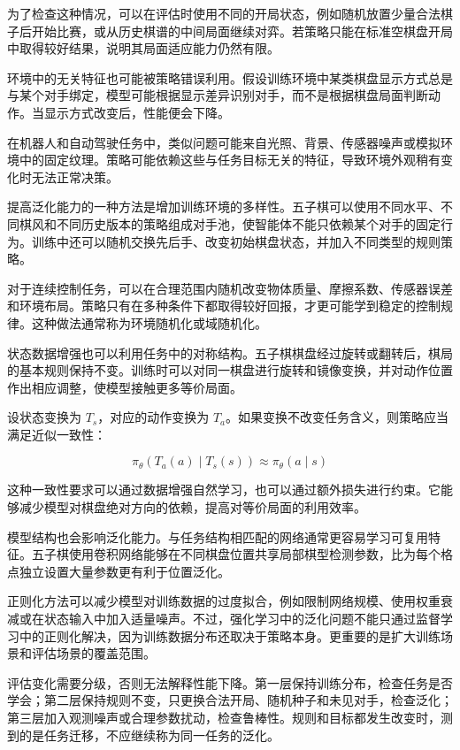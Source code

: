 为了检查这种情况，可以在评估时使用不同的开局状态，例如随机放置少量合法棋子后开始比赛，或从历史棋谱的中间局面继续对弈。若策略只能在标准空棋盘开局中取得较好结果，说明其局面适应能力仍然有限。

环境中的无关特征也可能被策略错误利用。假设训练环境中某类棋盘显示方式总是与某个对手绑定，模型可能根据显示差异识别对手，而不是根据棋盘局面判断动作。当显示方式改变后，性能便会下降。

在机器人和自动驾驶任务中，类似问题可能来自光照、背景、传感器噪声或模拟环境中的固定纹理。策略可能依赖这些与任务目标无关的特征，导致环境外观稍有变化时无法正常决策。

提高泛化能力的一种方法是增加训练环境的多样性。五子棋可以使用不同水平、不同棋风和不同历史版本的策略组成对手池，使智能体不能只依赖某个对手的固定行为。训练中还可以随机交换先后手、改变初始棋盘状态，并加入不同类型的规则策略。

对于连续控制任务，可以在合理范围内随机改变物体质量、摩擦系数、传感器误差和环境布局。策略只有在多种条件下都取得较好回报，才更可能学到稳定的控制规律。这种做法通常称为环境随机化或域随机化。

状态数据增强也可以利用任务中的对称结构。五子棋棋盘经过旋转或翻转后，棋局的基本规则保持不变。训练时可以对同一棋盘进行旋转和镜像变换，并对动作位置作出相应调整，使模型接触更多等价局面。

设状态变换为 $T_s$，对应的动作变换为 $T_a$。如果变换不改变任务含义，则策略应当满足近似一致性：

\begin{equation}
\pi_{\theta}
\left(
T_a(a)\mid T_s(s)
\right)
\approx
\pi_{\theta}(a\mid s)
\end{equation}

这种一致性要求可以通过数据增强自然学习，也可以通过额外损失进行约束。它能够减少模型对棋盘绝对方向的依赖，提高对等价局面的利用效率。

模型结构也会影响泛化能力。与任务结构相匹配的网络通常更容易学习可复用特征。五子棋使用卷积网络能够在不同棋盘位置共享局部棋型检测参数，比为每个格点独立设置大量参数更有利于位置泛化。

正则化方法可以减少模型对训练数据的过度拟合，例如限制网络规模、使用权重衰减或在状态输入中加入适量噪声。不过，强化学习中的泛化问题不能只通过监督学习中的正则化解决，因为训练数据分布还取决于策略本身。更重要的是扩大训练场景和评估场景的覆盖范围。

评估变化需要分级，否则无法解释性能下降。第一层保持训练分布，检查任务是否学会；第二层保持规则不变，只更换合法开局、随机种子和未见对手，检查泛化；第三层加入观测噪声或合理参数扰动，检查鲁棒性。规则和目标都发生改变时，测到的是任务迁移，不应继续称为同一任务的泛化。

